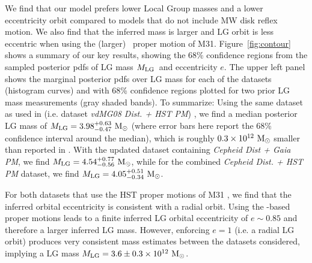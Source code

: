 \documentclass[twocolumn]{aastex631}
\newcommand{\mlg}{\ensuremath{M_{\rm LG}}}
\begin{document}
We find that our model prefers lower Local Group masses and a lower eccentricity
orbit compared to models that do not include MW disk reflex motion.
We also find that the inferred mass is larger and LG orbit is less eccentric
when using the (larger) \gaia\ proper motion of M31.
Figure~\ref{fig:contour} shows a summary of our key results, showing the 68\%
confidence regions from the sampled posterior pdfs of LG mass \mlg\ and
eccentricity $e$.
The upper left panel shows the marginal posterior pdfs over LG mass for each of
the datasets (histogram curves) and with 68\% confidence regions plotted for two
prior LG mass measurements (gray shaded bands).
To summarize: Using the same dataset as used in \citet{vdm2012} 
(i.e. dataset \textit{vdMG08 Dist. + HST PM})
, we find a
median posterior LG mass of $\mlg = 3.98 ^{+0.63}_{-0.47}~\Msun$ (where error 
bars here report the 68\% confidence interval around the median), which is
roughly $0.3\times 10^{12}~\mathrm{M}_\odot$ smaller than reported in \cite{vdm2012}. With 
the updated dataset containing \textit{Cepheid Dist + Gaia PM}, we find 
$\mlg = 4.54 ^{+0.77}_{-0.56}~\Msun$, while for the combined \textit{Cepheid 
Dist. + HST PM} dataset, we find $\mlg = 4.05^{+0.51}_{-0.34}~\Msun$.


For both datasets that use the HST proper motions of M31 \citep{vdm2012}, we
find that the inferred orbital eccentricity is consistent with a radial orbit.
Using the \gaia-based proper motions \citep{Salomon2021} leads to a finite
inferred LG orbital eccentricity of $e\sim 0.85$ and therefore a larger inferred
LG mass.
However, enforcing $e=1$ (i.e. a radial LG orbit) produces very consistent mass
estimates between the datasets considered, implying a LG mass $\mlg = 3.6
\pm 0.3 \times 10^{12}~\Msun$. 

\end{document}
